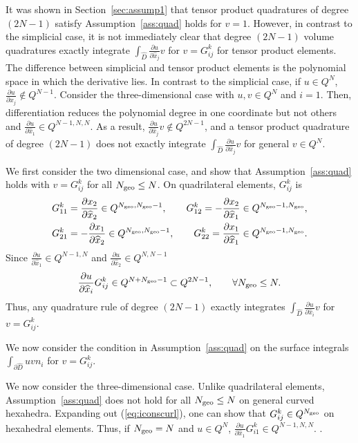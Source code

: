 \documentclass{svjour3}                     %
\renewcommand{\hat}{\widehat}
\newcommand{\pd}[2]{\frac{\partial#1}{\partial#2}}
\renewcommand{\note}[1]{{\color{blue}{#1}}}
\begin{document}
It was shown in Section~\ref{sec:assump1} that tensor product quadratures of degree $(2N-1)$ satisfy Assumption~\ref{ass:quad} holds for $v = 1$.  However, in contrast to the simplicial case, it is not immediately clear that degree $(2N-1)$ volume quadratures exactly integrate $\int_{\hat{D}} \pd{u}{\hat{x}_j}v$ for $v = G^k_{ij}$ for tensor product elements.  The difference between simplicial and tensor product elements is the polynomial space in which the derivative lies.  In contrast to the simplicial case, if $u \in Q^N$, $\pd{u}{\hat{x}_j} \not\in Q^{N-1}$.  Consider the three-dimensional case with $u, v \in Q^N$ and $i = 1$.  Then, differentiation reduces the polynomial degree in one coordinate but not others and $\pd{u}{\hat{x}_1} \in Q^{N-1,N,N}$.  As a result, $\pd{u}{\hat{x}_j}v \not\in Q^{2N-1}$, and a tensor product quadrature of degree $(2N-1)$ does not exactly integrate $\int_{\hat{D}} \pd{u}{\hat{x}_j}v$ for general $v\in Q^N$.  

We first consider the two dimensional case, and show that Assumption~\ref{ass:quad} holds with $v = G^k_{ij}$ for all $N_{\rm geo} \leq N$.  On quadrilateral elements, $G^k_{ij}$ is
\begin{align*}
G^k_{11} &= \pd{x_2}{\hat{x}_2} \in Q^{N_{\rm geo}, N_{\rm geo}-1}, \qquad G^k_{12} = -\pd{x_2}{\hat{x}_1} \in Q^{N_{\rm geo}-1, N_{\rm geo}},\\
G^k_{21} &= -\pd{x_1}{\hat{x}_2} \in Q^{N_{\rm geo}, N_{\rm geo}-1}, \qquad G^k_{22} = \pd{x_1}{\hat{x}_1}\in Q^{N_{\rm geo}-1, N_{\rm geo}}.
\end{align*}
Since $\pd{u}{\hat{x}_1} \in Q^{N-1,N}$ and $\pd{u}{\hat{x}_2} \in Q^{N,N-1}$
\[
\pd{u}{\hat{x}_i}G^k_{ij} \in Q^{N+N_{\rm geo}-1} \subset Q^{2N-1}, \qquad \forall N_{\rm geo}\leq N.
\]
Thus, any quadrature rule of degree $(2N-1)$ exactly integrates $\int_{\hat{D}}\pd{u}{\hat{x}_i}v$ for $v = G^k_{ij}$.  

We now consider the condition in Assumption~\ref{ass:quad} on the surface integrals $\int_{\partial \hat{D}} u v n_i$ for $v= G^k_{ij}$.  \note{Finish}

We now consider the three-dimensional case.  Unlike quadrilateral elements, Assumption~\ref{ass:quad} does not hold for all $N_{\rm geo} \leq N$ on general curved hexahedra.  Expanding out (\ref{eq:iconscurl}), one can show that $G^k_{ij} \in Q^{N_{\rm geo}}$ on hexahedral elements.  Thus, if $N_{\rm geo} = N$ and $u\in Q^N$, $\pd{u}{\hat{x}_1} G^k_{i1} \in Q^{N-1,N,N}$.  \note{Finish}.  
\end{document}
